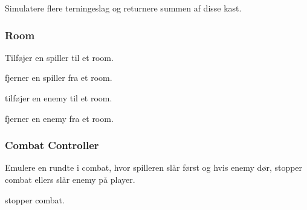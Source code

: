 {%
  Simulatere flere terningeslag og returnere summen af disse kast.
}

\subsubsection{Room}

{%
  Tilføjer en spiller til et room.
}

{%
  fjerner en spiller fra et room.
}

{%
  tilføjer en enemy til et room.
}

{%
  fjerner en enemy fra et room.
}

\subsubsection{Combat Controller}

{%
  Emulere en rundte i combat, hvor spilleren slår først og hvis enemy dør, stopper combat ellers slår enemy på player.
}

{%
  stopper combat.
}


